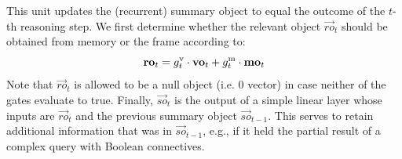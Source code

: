 This unit updates the (recurrent) summary object to equal the outcome of the $t$-th reasoning step.
We first determine whether the relevant object $\vec{ro}_t$ should be obtained from memory or the frame according to:
\[ \mathbf{ro}_t = g^{\mathrm{v}}_t \cdot \mathbf{vo}_t + g^{\mathrm{m}}_t \cdot \mathbf{mo}_t \]
Note that $\vec{ro}_t$ is allowed to be a null object (i.e. 0 vector) in case neither of the gates evaluate to true.
Finally, $\vec{so}_t$ is the output of a simple linear layer whose inputs are $\vec{ro}_t$ and the previous summary object $\vec{so}_{t-1}$.
This serves to retain additional information that was in $\vec{so}_{t-1}$, e.g., if it held the partial result of a complex query with Boolean connectives.
